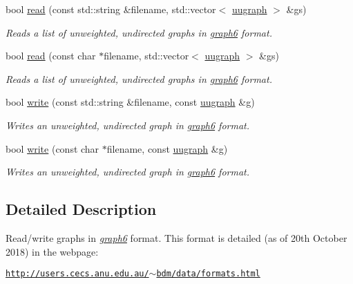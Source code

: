 \begin{DoxyCompactItemize}
bool \hyperlink{namespacelgraph_1_1io_1_1graph6_ad36631b2e69f1a58d9678ee01a335739}{read} (const std\-::string \&filename, std\-::vector$<$ \hyperlink{classlgraph_1_1uugraph}{uugraph} $>$ \&gs)
\begin{DoxyCompactList}\small\item\em Reads a list of unweighted, undirected graphs in {\itshape \hyperlink{namespacelgraph_1_1io_1_1graph6}{graph6}} format. \end{DoxyCompactList}\item 
bool \hyperlink{namespacelgraph_1_1io_1_1graph6_a90d5dd8ee748263b93cdb4513a36cbf5}{read} (const char $\ast$filename, std\-::vector$<$ \hyperlink{classlgraph_1_1uugraph}{uugraph} $>$ \&gs)
\begin{DoxyCompactList}\small\item\em Reads a list of unweighted, undirected graphs in {\itshape \hyperlink{namespacelgraph_1_1io_1_1graph6}{graph6}} format. \end{DoxyCompactList}\item 
bool \hyperlink{namespacelgraph_1_1io_1_1graph6_ad011c538d80f9dafb02b1504b9c07e44}{write} (const std\-::string \&filename, const \hyperlink{classlgraph_1_1uugraph}{uugraph} \&g)
\begin{DoxyCompactList}\small\item\em Writes an unweighted, undirected graph in {\itshape \hyperlink{namespacelgraph_1_1io_1_1graph6}{graph6}} format. \end{DoxyCompactList}\item 
bool \hyperlink{namespacelgraph_1_1io_1_1graph6_a5e2bba91e66667d06c699fbf7c6c634c}{write} (const char $\ast$filename, const \hyperlink{classlgraph_1_1uugraph}{uugraph} \&g)
\begin{DoxyCompactList}\small\item\em Writes an unweighted, undirected graph in {\itshape \hyperlink{namespacelgraph_1_1io_1_1graph6}{graph6}} format. \end{DoxyCompactList}\end{DoxyCompactItemize}


\subsection{Detailed Description}
Read/write graphs in {\itshape \hyperlink{namespacelgraph_1_1io_1_1graph6}{graph6}} format. This format is detailed (as of 20th October 2018) in the webpage\-:

\href{http://users.cecs.anu.edu.au/~bdm/data/formats.html}{\tt http\-://users.\-cecs.\-anu.\-edu.\-au/$\sim$bdm/data/formats.\-html}

